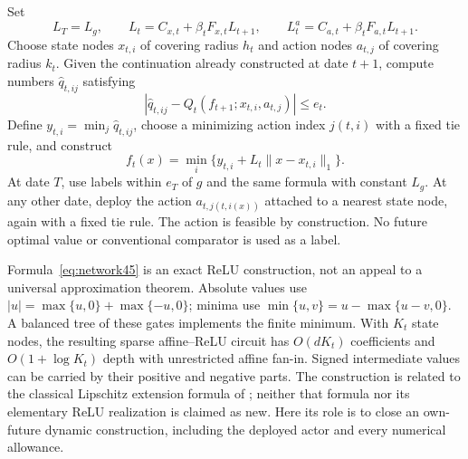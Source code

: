 Set
\begin{equation}\label{eq:constants45}
 L_T=L_g,\qquad L_t=C_{x,t}+\beta_tF_{x,t}L_{t+1},\qquad
 L^a_t=C_{a,t}+\beta_tF_{a,t}L_{t+1}.
\end{equation}
Choose state nodes $x_{t,i}$ of covering radius $h_t$ and action nodes $a_{t,j}$ of covering radius $k_t$. Given the continuation already constructed at date $t+1$, compute numbers $\widehat q_{t,ij}$ satisfying
\begin{equation}\label{eq:oracle45}
 |\widehat q_{t,ij}-Q_t(f_{t+1};x_{t,i},a_{t,j})|\le e_t.
\end{equation}
Define $y_{t,i}=\min_j\widehat q_{t,ij}$, choose a minimizing action index $j(t,i)$ with a fixed tie rule, and construct
\begin{equation}\label{eq:network45}
 f_t(x)=\min_i\{y_{t,i}+L_t\|x-x_{t,i}\|_1\}.
\end{equation}
At date $T$, use labels within $e_T$ of $g$ and the same formula with constant $L_g$. At any other date, deploy the action $a_{t,j(t,i(x))}$ attached to a nearest state node, again with a fixed tie rule. The action is feasible by construction. No future optimal value or conventional comparator is used as a label.

Formula~\eqref{eq:network45} is an exact ReLU construction, not an appeal to a universal approximation theorem. Absolute values use $|u|=\max\{u,0\}+\max\{-u,0\}$; minima use $\min\{u,v\}=u-\max\{u-v,0\}$. A balanced tree of these gates implements the finite minimum. With $K_t$ state nodes, the resulting sparse affine--ReLU circuit has $O(dK_t)$ coefficients and $O(1+\log K_t)$ depth with unrestricted affine fan-in. Signed intermediate values can be carried by their positive and negative parts. The construction is related to the classical Lipschitz extension formula of \citet{mcshane1934}; neither that formula nor its elementary ReLU realization is claimed as new. Here its role is to close an own-future dynamic construction, including the deployed actor and every numerical allowance.

